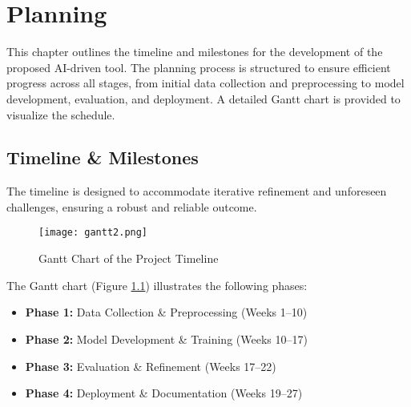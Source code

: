 
%



\chapter{Planning}
\label{cha:Planning}

This chapter outlines the timeline and milestones for the development of the proposed AI-driven tool. The planning process is structured to ensure efficient progress across all stages, from initial data collection and preprocessing to model development, evaluation, and deployment. A detailed Gantt chart is provided to visualize the schedule.
\section{Timeline \& Milestones}
The timeline is designed to accommodate iterative refinement and unforeseen challenges, ensuring a robust and reliable outcome.

\begin{figure}[h]
    \centering
    \texttt{[image: gantt2.png]} 
    \caption{Gantt Chart of the Project Timeline}
    \label{fig:gantt}
\end{figure}

The Gantt chart (Figure \ref{fig:gantt}) illustrates the following phases:
\begin{itemize}
\item \textbf{Phase 1:} Data Collection \& Preprocessing (Weeks 1–10)
\item \textbf{Phase 2:} Model Development \& Training (Weeks 10–17)
\item \textbf{Phase 3:} Evaluation \& Refinement (Weeks 17–22)
\item \textbf{Phase 4:} Deployment \& Documentation (Weeks 19–27)
\end{itemize}
